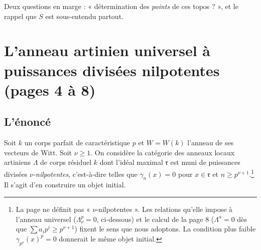 \documentclass[11pt,a4paper]{article}
\begin{document}
Deux questions en marge : « détermination des \emph{points} de ces topos ? »,
et le rappel que $S$ est sous-entendu partout.

\section*{L'anneau artinien universel à puissances divisées nilpotentes (pages 4 à 8)}

\subsection*{L'énoncé}

Soit $k$ un corps parfait de caractéristique $p$ et $W = W(k)$ l'anneau de
ses vecteurs de Witt. Soit $\nu \geqslant 1$. On considère la catégorie des
anneaux locaux artiniens $\Lambda$ de corps résiduel $k$ dont l'idéal maximal
$\mathfrak{r}$ est muni de puissances divisées \emph{$\nu$-nilpotentes},
c'est-à-dire telles que $\gamma_n(x) = 0$ pour $x \in \mathfrak{r}$ et
$n \geqslant p^{\nu+1}$.\footnote{La page ne définit pas « $\nu$-nilpotentes
». Les relations qu'elle impose à l'anneau universel ($\Lambda_\nu^{p} = 0$,
ci-dessous) et le calcul de la page 8 ($\Lambda^{a} = 0$ dès que $\sum a_i
p^{i} \geqslant p^{\nu+1}$) fixent le sens que nous adoptons. La condition
plus faible $\gamma_{p^{\nu}}(x)^{p} = 0$ donnerait le même objet
initial.} Il s'agit d'en construire un objet initial.
\end{document}

